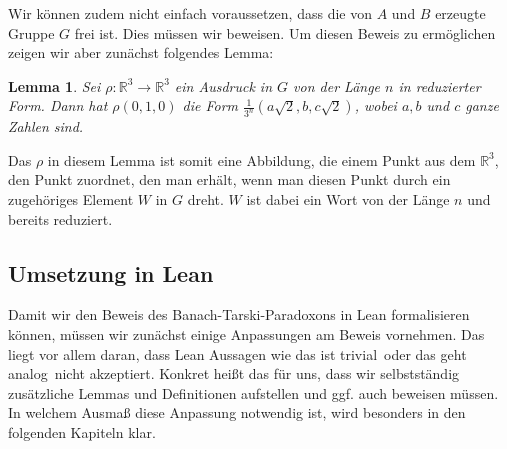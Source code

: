 \documentclass[10pt]{article}
\newtheorem{lemma}[satz]{Lemma}
\begin{document}
\noindent Wir können zudem nicht einfach voraussetzen, dass die von $A$ und $B$ erzeugte Gruppe $G$ frei ist. Dies müssen wir beweisen. Um diesen Beweis zu ermöglichen zeigen wir aber zunächst folgendes Lemma:
\begin{lemma}\label{lemma1}
    Sei $\rho : \mathbb{R}^3 \rightarrow \mathbb{R}^3$ ein Ausdruck in $G$ von der Länge $n$ in reduzierter Form. Dann hat $\rho (0,1,0)$ die Form $\frac{1}{3^n}(a\sqrt{2},b,c\sqrt{2})$, wobei $a,b$ und $c$ ganze Zahlen sind.
\end{lemma}
\noindent Das $\rho$ in diesem Lemma ist somit eine Abbildung, die einem Punkt aus dem $\mathbb{R}^3$, den Punkt zuordnet, den man erhält, wenn man diesen Punkt durch ein zugehöriges Element $W$ in $G$ dreht. $W$ ist dabei ein Wort von der Länge $n$ und bereits reduziert.\par


\subsection{Umsetzung in Lean}
Damit wir den Beweis des Banach-Tarski-Paradoxons in Lean formalisieren können, müssen wir zunächst einige Anpassungen am Beweis vornehmen. Das liegt vor allem daran, dass Lean Aussagen wie \glqq das ist trivial\grqq~oder \glqq das geht analog\grqq~nicht akzeptiert. Konkret heißt das für uns, dass wir selbstständig zusätzliche Lemmas und Definitionen aufstellen und ggf. auch beweisen müssen. In welchem Ausmaß diese Anpassung notwendig ist, wird besonders in den folgenden Kapiteln klar.
\end{document}
